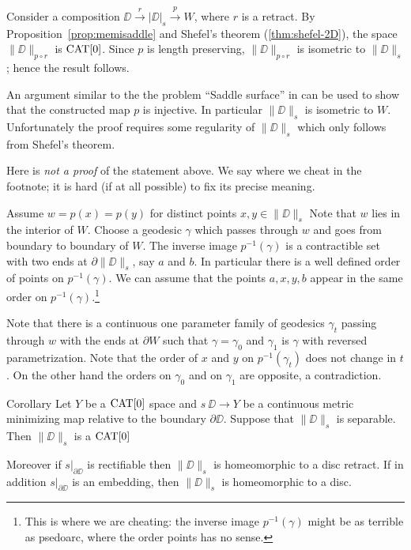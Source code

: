 \documentclass{article}
\begin{document}
Consider a composition $\DD\xrightarrow{r} |\DD|_s\xrightarrow{p} W$, where $r$ is a retract.
By Proposition~\ref{prop:memisaddle}
and Shefel's theorem (\ref{thm:shefel-2D}), the space $\|\DD\|_{p\circ r}$ is $\mathop{\rm CAT}\nolimits[0]$.
Since $p$ is length preserving, $\|\DD\|_{p\circ r}$ is isometric to $\|\DD\|_s$;
hence the result follows.
\qeds



An argument similar to the the problem ``Saddle surface'' in \cite{petrunin-orthodox} can be used to show that the constructed map $p$ is injective. 
In particular $\|\DD\|_s$ is isometric to $W$.
Unfortunately the proof requires some regularity of $\|\DD\|_s$ which only follows from Shefel's theorem. 

Here is \emph{not a proof} of the statement above.
We say where we cheat in the footnote; 
it is hard (if at all possible) to fix its precise meaning.

 Assume  $w=p(x)=p(y)$ for distinct points $x,y\in\|\DD\|_s$
Note that  $w$ lies in the interior of $W$.
Choose a geodesic $\gamma$ which passes through $w$ and goes 
from boundary to boundary of $W$.
The inverse image $p^{-1}(\gamma)$ is a contractible set with two ends at $\partial\|\DD\|_s$, say $a$ and $b$.
In particular there is a well defined order of  points on $p^{-1}(\gamma)$.
We can assume that the points $a,x,y,b$ appear in the same order on $p^{-1}(\gamma)$.\footnote{This is where we are cheating: the inverse image $p^{-1}(\gamma)$ might be as terrible as psedoarc, where the order points has no sense.}

Note that there is a continuous one parameter family of geodesics $\gamma_t$ passing through $w$ with the ends at $\partial W$
such that $\gamma=\gamma_0$ and $\gamma_1$ is $\gamma$ with reversed parametrization.
Note that the order of $x$ and $y$ on $p^{-1}(\gamma_t)$ does not change in $t$.
On the other hand the orders on $\gamma_0$ and on $\gamma_1$ are opposite, a contradiction.\qeds 

\begin{thm}{Corollary}\label{cor:main}
Let $Y$ be a $\mathop{\rm CAT}\nolimits[0]$ space 
and $s\:\DD\to Y$ be a continuous metric minimizing map relative to the boundary $\partial\DD$.
Suppose that $\|\DD\|_s$  is separable.
Then $\|\DD\|_s$ is a $\mathop{\rm CAT}\nolimits[0]$

Moreover if $s|_{\partial\DD}$ is rectifiable then $\|\DD\|_s$ is homeomorphic to a  disc retract. 
If in addition  $s|_{\partial\DD}$ is an embedding,
then $\|\DD\|_s$ is homeomorphic to a disc.
\end{thm}
\end{document}
